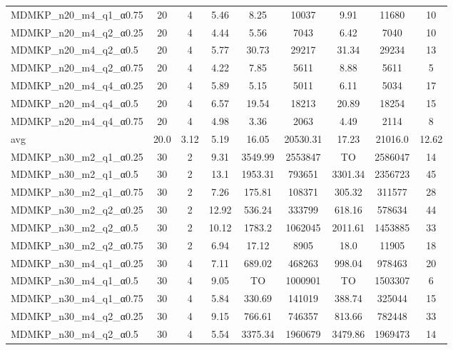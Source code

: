 \begin{table}[!ht]
{\begin{tabular}{lcccccccc}
MDMKP\_n20\_m4\_q1\_α0.75 & 20 & 4 &  \textcolor{blue2}{5.46} & 8.25 & 10037 & 9.91 & 11680 & 10 \\
MDMKP\_n20\_m4\_q2\_α0.25 & 20 & 4 &  \textcolor{blue2}{4.44} & 5.56 & 7043 & 6.42 & 7040 & 10 \\
MDMKP\_n20\_m4\_q2\_α0.5 & 20 & 4 &  \textcolor{blue2}{5.77} & 30.73 & 29217 & 31.34 & 29234 & 13 \\
MDMKP\_n20\_m4\_q2\_α0.75 & 20 & 4 &  \textcolor{blue2}{4.22} & 7.85 & 5611 & 8.88 & 5611 & 5 \\
MDMKP\_n20\_m4\_q4\_α0.25 & 20 & 4 & 5.89 &  \textcolor{blue2}{5.15} & 5011 & 6.11 & 5034 & 17 \\
MDMKP\_n20\_m4\_q4\_α0.5 & 20 & 4 &  \textcolor{blue2}{6.57} & 19.54 & 18213 & 20.89 & 18254 & 15 \\
MDMKP\_n20\_m4\_q4\_α0.75 & 20 & 4 & 4.98 &  \textcolor{blue2}{3.36} & 2063 & 4.49 & 2114 & 8 \\
\cline{1-9} avg & 20.0 & 3.12 & 5.19 & 16.05& 20530.31 & 17.23& 21016.0 & 12.62\\ \cline{1-9}
MDMKP\_n30\_m2\_q1\_α0.25 & 30 & 2 &  \textcolor{blue2}{9.31} & 3549.99 & 2553847 & TO & 2586047 & 14 \\
MDMKP\_n30\_m2\_q1\_α0.5 & 30 & 2 &  \textcolor{blue2}{13.1} & 1953.31 & 793651 & 3301.34 & 2356723 & 45 \\
MDMKP\_n30\_m2\_q1\_α0.75 & 30 & 2 &  \textcolor{blue2}{7.26} & 175.81 & 108371 & 305.32 & 311577 & 28 \\
MDMKP\_n30\_m2\_q2\_α0.25 & 30 & 2 &  \textcolor{blue2}{12.92} & 536.24 & 333799 & 618.16 & 578634 & 44 \\
MDMKP\_n30\_m2\_q2\_α0.5 & 30 & 2 &  \textcolor{blue2}{10.12} & 1783.2 & 1062045 & 2011.61 & 1453885 & 33 \\
MDMKP\_n30\_m2\_q2\_α0.75 & 30 & 2 &  \textcolor{blue2}{6.94} & 17.12 & 8905 & 18.0 & 11905 & 18 \\
MDMKP\_n30\_m4\_q1\_α0.25 & 30 & 4 &  \textcolor{blue2}{7.11} & 689.02 & 468263 & 998.04 & 978463 & 20 \\
MDMKP\_n30\_m4\_q1\_α0.5 & 30 & 4 &  \textcolor{blue2}{9.05} & TO & 1000901 & TO & 1503307 & 6 \\
MDMKP\_n30\_m4\_q1\_α0.75 & 30 & 4 &  \textcolor{blue2}{5.84} & 330.69 & 141019 & 388.74 & 325044 & 15 \\
MDMKP\_n30\_m4\_q2\_α0.25 & 30 & 4 &  \textcolor{blue2}{9.15} & 766.61 & 746357 & 813.66 & 782448 & 33 \\
MDMKP\_n30\_m4\_q2\_α0.5 & 30 & 4 &  \textcolor{blue2}{5.54} & 3375.34 & 1960679 & 3479.86 & 1969473 & 14 \\

\end{tabular}}
\end{table}

